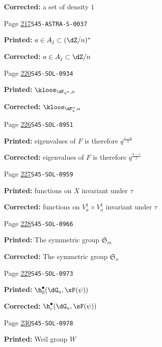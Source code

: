 \begin{description}
\par\noindent\textbf{Corrected:} a set of density $1$
\smallskip
\item[\hypertarget{apparatus:EN-0161}{161}] Page \hyperlink{printpage:en:217}{217}\quad\texttt{S45-ASTRA-S-0037}
\par\noindent\textbf{Printed:} $a\in A_j\subset (\dZ/n)^\ast$
\par\noindent\textbf{Corrected:} $a\in A_j\subset\dZ/n$
\smallskip
\item[\hypertarget{apparatus:EN-0162}{162}] Page \hyperlink{printpage:en:220}{220}\quad\texttt{S45-SOL-0934}
\par\noindent\textbf{Printed:} \(\kloos_{\dF_{q^n},a}\)
\par\noindent\textbf{Corrected:} \(\kloos_{\dF_q^n,a}\)
\smallskip
\item[\hypertarget{apparatus:EN-0163}{163}] Page \hyperlink{printpage:en:226}{226}\quad\texttt{S45-SOL-0951}
\par\noindent\textbf{Printed:} eigenvalues of $F$ is therefore $q^{\frac{1-n}{2}}$
\par\noindent\textbf{Corrected:} eigenvalues of $F$ is therefore $q^{\frac{n-1}{2}}$
\smallskip
\item[\hypertarget{apparatus:EN-0164}{164}] Page \hyperlink{printpage:en:227}{227}\quad\texttt{S45-SOL-0959}
\par\noindent\textbf{Printed:} functions on $X$ invariant under $\tau$
\par\noindent\textbf{Corrected:} functions on $V_a^1\times V_a^1$ invariant under $\tau$
\smallskip
\item[\hypertarget{apparatus:EN-0165}{165}] Page \hyperlink{printpage:en:228}{228}\quad\texttt{S45-SOL-0966}
\par\noindent\textbf{Printed:} The symmetric group $\mathfrak{S}_m$
\par\noindent\textbf{Corrected:} The symmetric group $\mathfrak{S}_n$
\smallskip
\item[\hypertarget{apparatus:EN-0166}{166}] Page \hyperlink{printpage:en:229}{229}\quad\texttt{S45-SOL-0973}
\par\noindent\textbf{Printed:} \(\h_0^\bullet(\dG_a,\sF(\psi))\)
\par\noindent\textbf{Corrected:} \(\h_c^\bullet(\dG_a,\sF(\psi))\)
\smallskip
\item[\hypertarget{apparatus:EN-0167}{167}] Page \hyperlink{printpage:en:230}{230}\quad\texttt{S45-SOL-0978}
\par\noindent\textbf{Printed:} Weil group $W$

\end{description}
